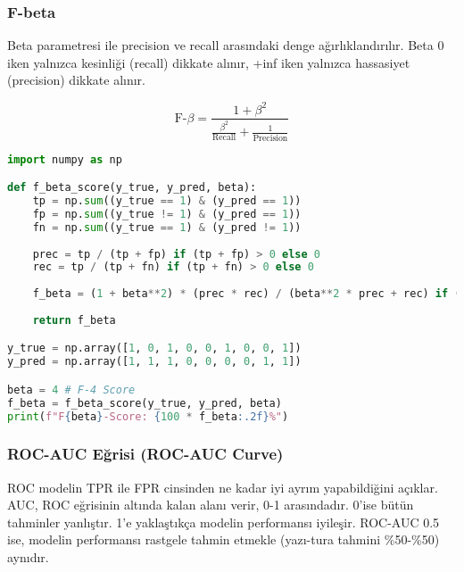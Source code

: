 \newpage

\subsubsection{F-beta}

Beta parametresi ile precision ve recall arasındaki denge ağırlıklandırılır. Beta 0 iken yalnızca kesinliği (recall) dikkate alınır, +inf iken yalnızca hassasiyet (precision) dikkate alınır.

\[\text{F-}\beta = \frac{1 + \beta^2}{\frac{\beta^2}{\text{Recall}} + \frac{1}{\text{Precision}}}\]

\begin{lstlisting}[language=Python]
import numpy as np

def f_beta_score(y_true, y_pred, beta):
    tp = np.sum((y_true == 1) & (y_pred == 1))
    fp = np.sum((y_true != 1) & (y_pred == 1))
    fn = np.sum((y_true == 1) & (y_pred != 1))
    
    prec = tp / (tp + fp) if (tp + fp) > 0 else 0
    rec = tp / (tp + fn) if (tp + fn) > 0 else 0
    
    f_beta = (1 + beta**2) * (prec * rec) / (beta**2 * prec + rec) if (beta**2 * prec + rec) > 0 else 0
    
    return f_beta

y_true = np.array([1, 0, 1, 0, 0, 1, 0, 0, 1])
y_pred = np.array([1, 1, 1, 0, 0, 0, 0, 1, 1])

beta = 4 # F-4 Score
f_beta = f_beta_score(y_true, y_pred, beta)
print(f"F{beta}-Score: {100 * f_beta:.2f}%")
\end{lstlisting}

\newpage

\subsubsection{ROC-AUC Eğrisi (ROC-AUC Curve)}

ROC modelin TPR ile FPR cinsinden ne kadar iyi ayrım yapabildiğini açıklar. AUC, ROC eğrisinin altında kalan alanı verir, 0-1 arasındadır. 0'ise bütün tahminler yanlıştır. 1'e yaklaştıkça modelin performansı iyileşir. ROC-AUC 0.5 ise, modelin performansı rastgele tahmin etmekle (yazı-tura tahmini \%50-\%50) aynıdır.

